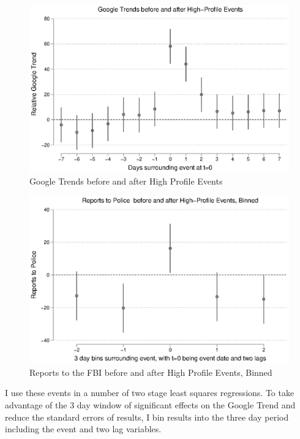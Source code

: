 \documentclass[AER,draftmode]{AEA}
\begin{document}
\begin{figure}
\includegraphics[width=\linewidth]{figures/events_trend.eps}
\caption{Google Trends before and after High Profile Events} \label{figure:events_trend}
\end{figure}

\begin{figure}
\includegraphics[width=\linewidth]{figures/events_police_binned.eps}
\caption{Reports to the FBI before and after High Profile Events, Binned} \label{figure:events_police_binned}
\end{figure}


I use these events in a number of two stage least squares regressions. To take advantage of the 3 day window of significant effects on the Google Trend and reduce the standard errors of results, I bin results into the three day period including the event and two lag variables.
\end{document}

